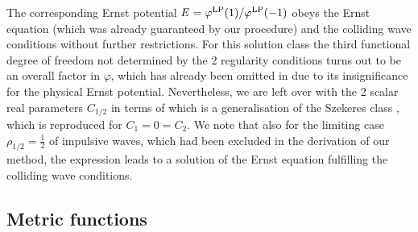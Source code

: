 \documentclass[12pt]{iopart}
\begin{document}
The corresponding Ernst potential $E=\varphi^{\rm LP}(1)/\varphi^{\rm LP}(-1)$ obeys the Ernst equation (which was already guaranteed by our procedure) and the colliding wave conditions without further restrictions. For this solution class the third functional degree of freedom not determined by the 2 regularity conditions turns out to be an overall factor in $\varphi$, which has already been omitted in  due to its insignificance for the physical Ernst potential. Nevertheless, we are left over with the 2 scalar real parameters $C_{1/2}$ in terms of which  is a generalisation of the Szekeres class , which is reproduced for $C_1=0=C_2$. We note that also for the limiting case $\rho_{1/2}=\frac12$ of impulsive waves, which had been excluded in the derivation of our method, the expression  leads to a solution of the Ernst equation fulfilling the colliding wave conditions.

\subsection{Metric functions}
\end{document}
